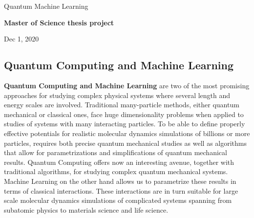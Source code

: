 \documentclass[%
oneside,                 %
final,                   %
10pt]{article}
\begin{document}

\newcommand{\exercisesection}[1]{\subsection*{#1}}






\thispagestyle{empty}

\begin{center}
{\LARGE\bf
\begin{spacing}{1.25}
Quantum Machine Learning
\end{spacing}
}
\end{center}


\begin{center}
{\bf Master of Science thesis project${}^{}$} \\ [0mm]
\end{center}

\begin{center}
\end{center}
    

\begin{center}
Dec 1, 2020
\end{center}

\vspace{1cm}


\subsection*{Quantum Computing and Machine Learning}



\textbf{Quantum Computing and Machine Learning} are two of the most promising
approaches for studying complex physical systems where several length
and energy scales are involved.  Traditional many-particle methods,
either quantum mechanical or classical ones, face huge dimensionality
problems when applied to studies of systems with many interacting
particles. To be able to define properly effective potentials for
realistic molecular dynamics simulations of billions or more
particles, requires both precise quantum mechanical studies as well as
algorithms that allow for parametrizations and simplifications of
quantum mechanical results. Quantum Computing offers now an
interesting avenue, together with traditional algorithms, for studying
complex quantum mechanical systems. Machine Learning on the other hand
allows us to parametrize these results in terms of classical
interactions. These interactions are in turn suitable for large scale
molecular dynamics simulations of complicated systems spanning from
subatomic physics to materials science and life science.
\end{document}
